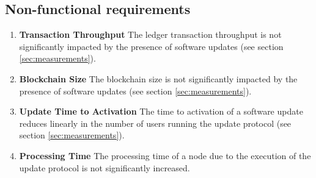 \subsection{Non-functional requirements} \label{sec:non-func-reqs}

\begin{enumerate}
\item \textbf{Transaction Throughput}
  \label{req:tr-throughput}
  The ledger transaction throughput is not significantly impacted by the
  presence of software updates (see section \ref{sec:measurements}).

\item \textbf{Blockchain Size} \label{req:blockchain-size} The blockchain size
  is not significantly impacted by the presence of software updates (see section
  \ref{sec:measurements}).

\item \textbf{Update Time to Activation}\label{req:update-thr} The time to
  activation of a software update reduces linearly in the number of users
  running the update protocol (see section \ref{sec:measurements}).

\item \textbf{Processing Time}
  \label{req:proc-time}
  The processing time of a node due to the execution of the update protocol is
  not significantly increased.

\end{enumerate}

